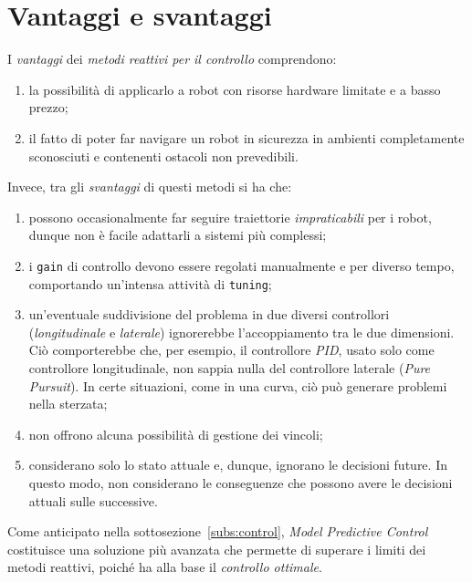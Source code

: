 \section{Vantaggi e svantaggi}
I \textit{vantaggi} dei \textit{metodi reattivi per il controllo} comprendono: 
\begin{enumerate}
    \item la possibilità di applicarlo a robot con risorse hardware limitate e a basso prezzo;
    \item il fatto di poter far navigare un robot in sicurezza in ambienti completamente 
    sconosciuti e contenenti ostacoli non prevedibili.
\end{enumerate}
Invece, tra gli \textit{svantaggi} di questi metodi si ha che:
\begin{enumerate}
    \item possono occasionalmente far seguire traiettorie \textit{impraticabili} per i robot, 
    dunque non è facile adattarli a sistemi più complessi;
    \item i \verb|gain| di controllo devono essere regolati manualmente e per diverso tempo, 
    comportando un'intensa attività di \verb|tuning|;
    \item un'eventuale suddivisione del problema in due diversi controllori 
    (\textit{longitudinale} e \textit{laterale}) ignorerebbe l'accoppiamento tra le due 
    dimensioni. Ciò comporterebbe che, per esempio, il controllore \textit{PID}, usato solo 
    come controllore longitudinale, non sappia nulla del controllore laterale 
    (\textit{Pure Pursuit}). In certe situazioni, come in una curva, ciò può generare problemi nella sterzata;
    \item non offrono alcuna possibilità di gestione dei vincoli;
    \item considerano solo lo stato attuale e, dunque, ignorano le decisioni future. In questo modo, non considerano le conseguenze che possono avere le decisioni attuali sulle successive.
\end{enumerate}
Come anticipato nella sottosezione~\ref{subs:control}, \textit{Model Predictive Control} 
costituisce una soluzione più avanzata che permette di superare i limiti dei metodi reattivi, 
poiché ha alla base il \textit{controllo ottimale}.